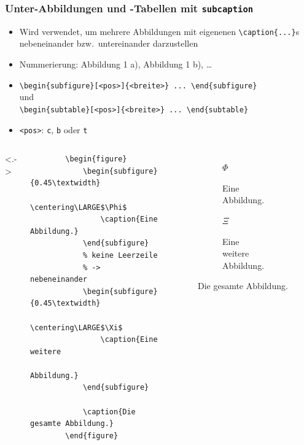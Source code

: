 \begin{frame}[<+->][fragile]
	\frametitle{Unter-Abbildungen und -Tabellen mit \texttt{subcaption}}
	\begin{itemize}
		\item Wird verwendet, um mehrere Abbildungen mit eigenenen \lstinline!\caption{...}!s nebeneinander bzw.\ untereinander darzustellen
		\item Nummerierung: Abbildung 1 a), Abbildung 1 b), \dots
		\item \lstinline!\begin{subfigure}[<pos>]{<breite>} ... \end{subfigure}!\\
		und\\
		\lstinline!\begin{subtable}[<pos>]{<breite>} ... \end{subtable}!
		\item \lstinline!<pos>!: \lstinline!c!, \lstinline!b! oder \lstinline!t!
	\end{itemize}
\end{frame}


\begin{frame}[<+->][fragile]
	\begin{columns}<.->
		\lstset{basicstyle=\footnotesize\ttfamily, frame=L, numbers=left, xleftmargin=0.5cm}
		\begin{lstlisting}
		\begin{figure}
		    \begin{subfigure}{0.45\textwidth}
		        \centering\LARGE$\Phi$
		        \caption{Eine Abbildung.}
		    \end{subfigure}
		    % keine Leerzeile
		    % -> nebeneinander
		    \begin{subfigure}{0.45\textwidth}
		        \centering\LARGE$\Xi$
		        \caption{Eine weitere
		            Abbildung.}
		    \end{subfigure}
		    
		    \caption{Die gesamte Abbildung.}
		\end{figure}
		\end{lstlisting}
		\begin{figure}
		    \begin{subfigure}{0.45\textwidth}
		        \centering\LARGE$\Phi$
		        \caption{Eine Abbildung.}
		    \end{subfigure}
		    \begin{subfigure}{0.45\textwidth}
		        \centering\LARGE$\Xi$
		        \caption{Eine weitere
		            Abbildung.}
		    \end{subfigure}
		    
		    \caption{Die gesamte Abbildung.}
		\end{figure}
	\end{columns}
	
	\bigskip
\end{frame}

